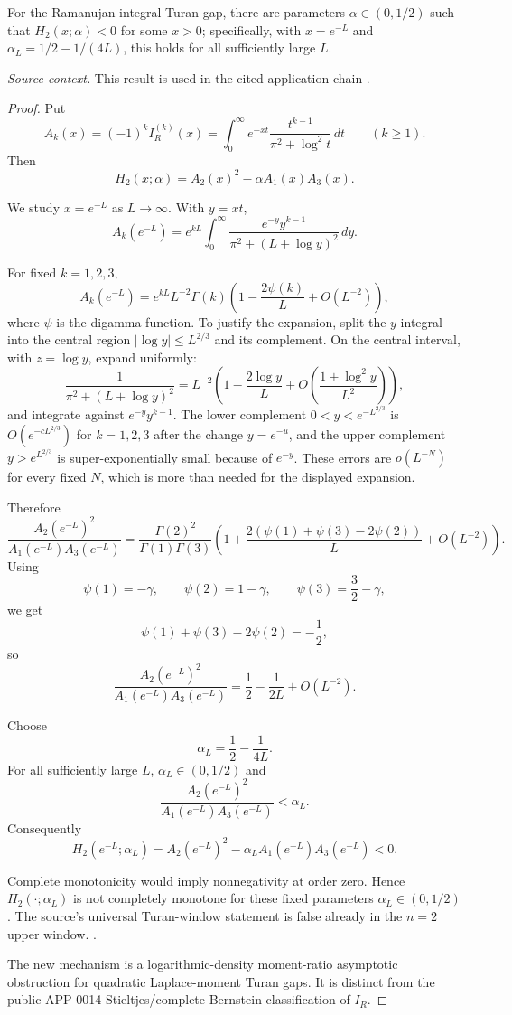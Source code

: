 \begin{proposition}
\label{res:ramanujan-turan-n2-upper-window-counterfamily}
For the Ramanujan integral Turan gap, there are parameters \(\alpha\in(0,1/2)\) such that \(H_2(x;\alpha)<0\) for some \(x>0\); specifically, with \(x=e^{-L}\) and \(\alpha_L=1/2-1/(4L)\), this holds for all sufficiently large \(L\).

\emph{Source context.} This result is used in the cited application chain \cite{mishra-swaminathan-ramanujan}.
\end{proposition}
\begin{proof}
Put
\[
A_k(x)=(-1)^k I_R^{(k)}(x)
=\int_0^\infty e^{-xt}\frac{t^{k-1}}{\pi^2+\log^2 t}\,dt
\qquad (k\ge1).
\]
Then
\[
H_2(x;\alpha)=A_2(x)^2-\alpha A_1(x)A_3(x).
\]

We study \(x=e^{-L}\) as \(L\to\infty\). With \(y=xt\),
\[
A_k(e^{-L})
=
e^{kL}\int_0^\infty
\frac{e^{-y}y^{k-1}}
{\pi^2+(L+\log y)^2}\,dy.
\]

For fixed \(k=1,2,3\),
\[
A_k(e^{-L})
=
e^{kL}L^{-2}\Gamma(k)
\left(1-\frac{2\psi(k)}{L}+O(L^{-2})\right),
\]
where \(\psi\) is the digamma function. To justify the expansion, split the \(y\)-integral into the central region \(|\log y|\le L^{2/3}\) and its complement. On the central interval, with \(z=\log y\), expand uniformly:
\[
\frac{1}{\pi^2+(L+\log y)^2}
=
L^{-2}\left(1-\frac{2\log y}{L}+O\left(\frac{1+\log^2 y}{L^2}\right)\right),
\]
and integrate against \(e^{-y}y^{k-1}\). The lower complement \(0<y<e^{-L^{2/3}}\) is \(O(e^{-cL^{2/3}})\) for \(k=1,2,3\) after the change \(y=e^{-u}\), and the upper complement \(y>e^{L^{2/3}}\) is super-exponentially small because of \(e^{-y}\). These errors are \(o(L^{-N})\) for every fixed \(N\), which is more than needed for the displayed expansion.

Therefore
\[
\frac{A_2(e^{-L})^2}{A_1(e^{-L})A_3(e^{-L})}
=
\frac{\Gamma(2)^2}{\Gamma(1)\Gamma(3)}
\left(
1+\frac{2(\psi(1)+\psi(3)-2\psi(2))}{L}+O(L^{-2})
\right).
\]
Using
\[
\psi(1)=-\gamma,\qquad
\psi(2)=1-\gamma,\qquad
\psi(3)=\frac32-\gamma,
\]
we get
\[
\psi(1)+\psi(3)-2\psi(2)=-\frac12,
\]
so
\[
\frac{A_2(e^{-L})^2}{A_1(e^{-L})A_3(e^{-L})}
=
\frac12-\frac{1}{2L}+O(L^{-2}).
\]

Choose
\[
\alpha_L=\frac12-\frac{1}{4L}.
\]
For all sufficiently large \(L\), \(\alpha_L\in(0,1/2)\) and
\[
\frac{A_2(e^{-L})^2}{A_1(e^{-L})A_3(e^{-L})}<\alpha_L.
\]
Consequently
\[
H_2(e^{-L};\alpha_L)
=
A_2(e^{-L})^2-\alpha_L A_1(e^{-L})A_3(e^{-L})
<0.
\]

Complete monotonicity would imply nonnegativity at order zero. Hence \(H_2(\cdot;\alpha_L)\) is not completely monotone for these fixed parameters \(\alpha_L\in(0,1/2)\). The source's universal Turan-window statement is false already in the \(n=2\) upper window. \cite{mishra-swaminathan-ramanujan}.

The new mechanism is a logarithmic-density moment-ratio asymptotic obstruction for quadratic Laplace-moment Turan gaps. It is distinct from the public APP-0014 Stieltjes/complete-Bernstein classification of \(I_R\).
\end{proof}

